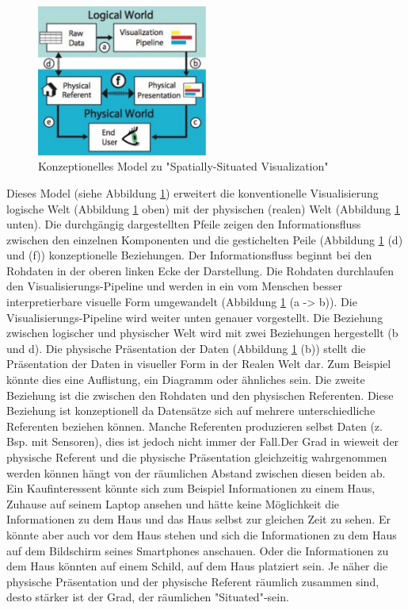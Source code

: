 \begin{figure}[H]
	\centering
	\includegraphics[width=0.5\textwidth]{resources/fundamentals/situated_visualization/spacially_situated_visualization_model.png}
	\caption{Konzeptionelles Model zu "Spatially-Situated Visualization" \cite{example_situated_visualization_concept}}
	\label{img:situated_visualization_concept}
\end{figure}

Dieses Model (siehe Abbildung \ref{img:situated_visualization_concept}) erweitert die konventionelle Visualisierung logische Welt (Abbildung \ref{img:situated_visualization_concept} oben) mit der physischen (realen) Welt (Abbildung \ref{img:situated_visualization_concept} unten). 
Die durchgängig dargestellten Pfeile zeigen den Informationsfluss zwischen den einzelnen Komponenten und die gestichelten Peile (Abbildung \ref{img:situated_visualization_concept} (d) und (f)) konzeptionelle Beziehungen. Der Informationsfluss beginnt bei den Rohdaten in der oberen linken Ecke der Darstellung. Die Rohdaten durchlaufen den Visualisierungs-Pipeline und werden in ein vom Menschen besser interpretierbare visuelle Form umgewandelt (Abbildung \ref{img:situated_visualization_concept} (a -> b)). Die Visualisierungs-Pipeline wird weiter unten genauer vorgestellt. 
Die Beziehung zwischen logischer und physischer Welt wird mit zwei Beziehungen hergestellt (b und d).  Die physische Präsentation der Daten (Abbildung \ref{img:situated_visualization_concept} (b)) stellt die Präsentation der Daten in visueller Form in der Realen Welt dar. 
Zum Beispiel könnte dies eine Auflistung, ein Diagramm oder ähnliches sein. Die zweite Beziehung ist die zwischen den Rohdaten und den physischen Referenten. Diese Beziehung ist konzeptionell da Datensätze sich auf mehrere unterschiedliche Referenten beziehen können. Manche Referenten produzieren selbst Daten (z. Bsp. mit Sensoren), dies ist jedoch nicht immer der Fall.Der Grad in wieweit der physische Referent und die physische Präsentation gleichzeitig wahrgenommen werden können hängt von der räumlichen Abstand zwischen diesen beiden ab. Ein Kaufinteressent könnte sich zum Beispiel Informationen zu einem Haus, Zuhause auf seinem Laptop ansehen und hätte keine Möglichkeit die Informationen zu dem Haus und das Haus selbst zur gleichen Zeit zu sehen. Er könnte aber auch vor dem Haus stehen und sich die Informationen zu dem Haus auf dem Bildschirm seines Smartphones anschauen. Oder die Informationen zu dem Haus könnten auf einem Schild, auf dem Haus platziert sein. Je näher die physische Präsentation und der physische Referent räumlich zusammen sind, desto stärker ist der Grad, der räumlichen "Situated"-sein. 

